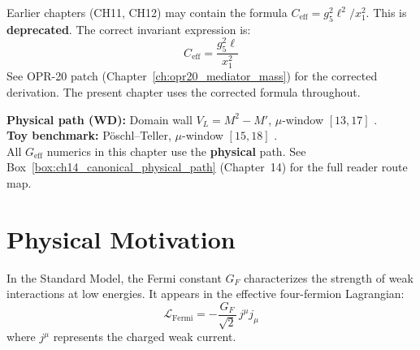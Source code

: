 \begin{tcolorbox}[colback=red!5!white, colframe=red!50!black,
    title=\textbf{Deprecation Note: Legacy Formula Correction}]

Earlier chapters (CH11, CH12) may contain the formula $C_{\text{eff}} = g_5^2 \ell^2 / x_1^2$.
This is \textbf{deprecated}. The correct invariant expression is:
\begin{equation}
    C_{\text{eff}} = \frac{g_5^2 \ell}{x_1^2}
\end{equation}
See OPR-20 patch (Chapter~\ref{ch:opr20_mediator_mass}) for the corrected derivation.
The present chapter uses the corrected formula throughout.

\end{tcolorbox}

\begin{tcolorbox}[colback=green!3!white, colframe=green!40!black,
    title=\textbf{Canonical Path Reminder}]
\textbf{Physical path (WD):} Domain wall $V_L = M^2 - M'$, $\mu$-window $[13, 17]$ \tagDc{}.\\
\textbf{Toy benchmark:} Pöschl--Teller, $\mu$-window $[15, 18]$ \tagM{}.\\[3pt]
All $G_{\text{eff}}$ numerics in this chapter use the \textbf{physical} path.
See Box~\ref{box:ch14_canonical_physical_path} (Chapter~14) for the full reader route map.
\end{tcolorbox}


\section{Physical Motivation}
\label{sec:ch19_motivation}

In the Standard Model, the Fermi constant $G_F$ characterizes the strength of weak
interactions at low energies. It appears in the effective four-fermion Lagrangian:
\begin{equation}
    \mathcal{L}_{\text{Fermi}} = -\frac{G_F}{\sqrt{2}} \, j^\mu j_\mu
    \label{eq:ch19_fermi_lagrangian}
\end{equation}
where $j^\mu$ represents the charged weak current.

